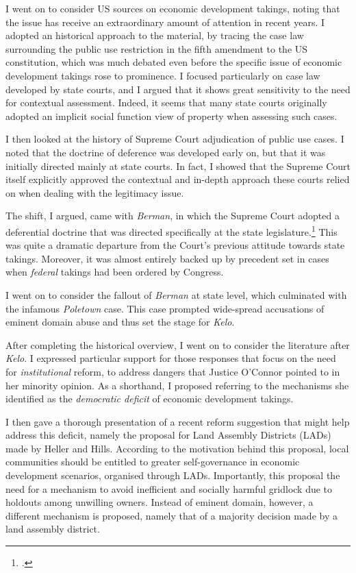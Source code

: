 {I went on to consider US sources on economic development takings, noting that the issue has receive an extraordinary amount of attention in recent years. I adopted an historical approach to the material, by tracing the case law surrounding the public use restriction in the fifth amendment to the US constitution, which was much debated even before the specific issue of economic development takings rose to prominence. I focused particularly on case law developed by state courts, and I argued that it shows great sensitivity to the need for contextual assessment. Indeed, it seems that many state courts originally adopted an implicit social function view of property when assessing such cases.

I then looked at the history of Supreme Court adjudication of public use cases. I noted that the doctrine of deference was developed early on, but that it was initially directed mainly at state courts. In fact, I showed that the Supreme Court itself explicitly approved the contextual and in-depth approach these courts relied on when dealing with the legitimacy issue.

The shift, I argued, came with {\it Berman}, in which the Supreme Court adopted a deferential doctrine that was directed specifically at the state legislature.\footcite{berman54} This was quite a dramatic departure from the Court's previous attitude towards state takings. Moreover, it was almost entirely backed up by precedent set in cases when {\it federal} takings had been ordered by Congress.

I went on to consider the fallout of {\it Berman} at state level, which culminated with the infamous {\it Poletown} case. This case prompted wide-spread accusations of eminent domain abuse and thus set the stage for {\it Kelo}.

After completing the historical overview, I went on to consider the literature after {\it Kelo}. I expressed particular support for those responses that focus on the need for {\it institutional} reform, to address  dangers that Justice O'Connor pointed to in her minority opinion. As a shorthand, I proposed referring to the mechanisms she identified as the {\it democratic deficit} of economic development takings. 

I then gave a thorough presentation of a recent reform suggestion that might help address this deficit, namely the proposal for Land Assembly Districts (LADs) made by Heller and Hills. According to the motivation behind this proposal, local communities should be entitled to greater self-governance in economic development scenarios, organised through LADs. Importantly, this proposal  the need for a mechanism to avoid inefficient and socially harmful gridlock due to holdouts among unwilling owners. Instead of eminent domain, however, a different mechanism is proposed, namely that of a majority decision made by a land assembly district.

}
